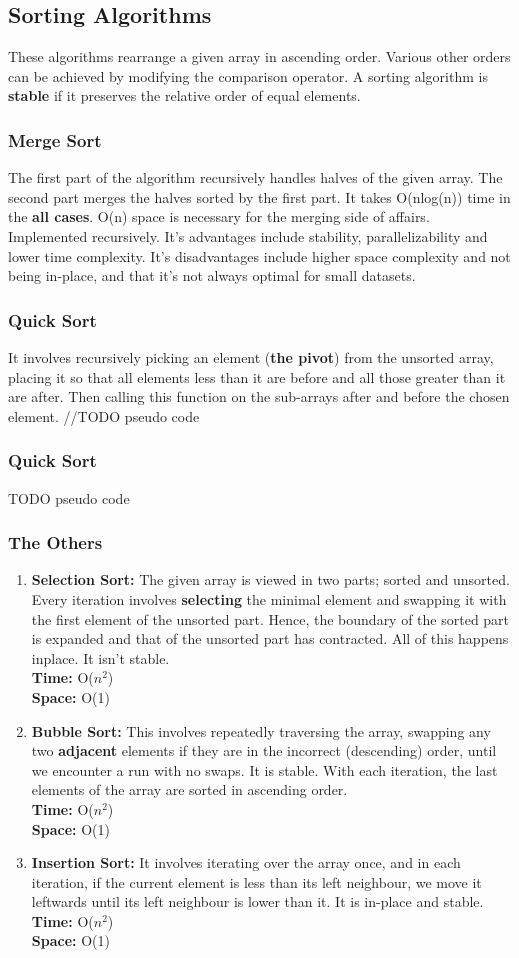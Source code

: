 \documentclass{article}
\newcommand*{\algodis}[4]{
    \textbf{#1:} #2\\%
    \textbf{Time:} #3 \\%
    \textbf{Space:} #4
}
\begin{document}
\subsection{Sorting Algorithms}
These algorithms rearrange a given array in ascending order.
Various other orders can be achieved by modifying the comparison operator.
A sorting algorithm is \textbf{stable} if it preserves the relative
order of equal elements.
\subsubsection*{Merge Sort}
The first part of the algorithm recursively handles halves of the given array.
The second part merges the halves sorted by the first part.
It takes O(nlog(n)) time in the \textbf{all cases}. O(n) space is necessary
for the merging side of affairs. Implemented recursively. It's advantages
include stability, parallelizability and lower time complexity. It's disadvantages
include higher space complexity and not being in-place, and that it's not
always optimal for small datasets. 
\subsubsection*{Quick Sort}
It involves recursively picking an element (\textbf{the pivot})
from the unsorted array, 
placing it so that all elements less than it are before and all
those greater than it are after. Then calling this function on the sub-arrays
after and before the chosen element.
//TODO pseudo code
\subsubsection*{Quick Sort}
TODO pseudo code
\subsubsection*{The Others}
\begin{enumerate}
    \item \algodis{Selection Sort}
    {The given array is viewed in two parts; sorted and unsorted.
    Every iteration involves \textbf{selecting} the minimal element
    and swapping it with the first element of the unsorted part. Hence,
    the boundary of the sorted part is expanded and that of the unsorted
    part has contracted. All of this happens inplace. It isn't stable.}
    {O($n^2$)}{O(1)}
    \item \algodis{Bubble Sort}
    {This involves repeatedly traversing the array,
    swapping any two \textbf{adjacent} elements if they are
    in the incorrect (descending) order, until we encounter
    a run with no swaps. It is stable. With each iteration,
    the last elements of the array are sorted in ascending order.}
    {O($n^2$)}
    {O(1)}
    \item \algodis{Insertion Sort}
    {It involves iterating over the array once, and in each iteration,
    if the current element is less than its left neighbour, we move it
    leftwards until its left neighbour is lower than it. It is in-place
    and stable.}
    {O($n^2$)}{O(1)}
\end{enumerate}
\end{document}
